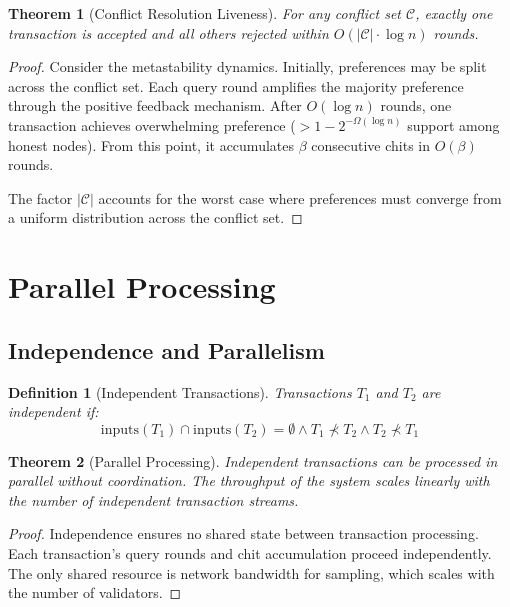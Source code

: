 \documentclass[11pt,a4paper]{article}
\newtheorem{theorem}{Theorem}
\newtheorem{definition}{Definition}
\begin{document}
\begin{theorem}[Conflict Resolution Liveness]
\label{thm:conflict-live}
For any conflict set $\mathcal{C}$, exactly one transaction is accepted and all others rejected within $O(|\mathcal{C}| \cdot \log n)$ rounds.
\end{theorem}

\begin{proof}
Consider the metastability dynamics. Initially, preferences may be split across the conflict set. Each query round amplifies the majority preference through the positive feedback mechanism. After $O(\log n)$ rounds, one transaction achieves overwhelming preference ($> 1 - 2^{-\Omega(\log n)}$ support among honest nodes). From this point, it accumulates $\beta$ consecutive chits in $O(\beta)$ rounds.

The factor $|\mathcal{C}|$ accounts for the worst case where preferences must converge from a uniform distribution across the conflict set.
\end{proof}

\section{Parallel Processing}

\subsection{Independence and Parallelism}

\begin{definition}[Independent Transactions]
Transactions $T_1$ and $T_2$ are independent if:
\begin{equation}
\text{inputs}(T_1) \cap \text{inputs}(T_2) = \emptyset \land T_1 \not\prec T_2 \land T_2 \not\prec T_1
\end{equation}
\end{definition}

\begin{theorem}[Parallel Processing]
\label{thm:parallel}
Independent transactions can be processed in parallel without coordination. The throughput of the system scales linearly with the number of independent transaction streams.
\end{theorem}

\begin{proof}
Independence ensures no shared state between transaction processing. Each transaction's query rounds and chit accumulation proceed independently. The only shared resource is network bandwidth for sampling, which scales with the number of validators.
\end{proof}
\end{document}

